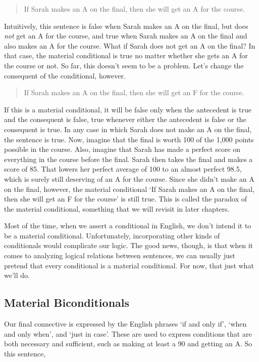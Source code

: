 \documentclass[../logic-text.tex]{subfiles}
\begin{document}
\begin{quote}
  If Sarah makes an A on the final, then she will get an A for the course.
\end{quote}

\noindent Intuitively, this sentence is false when Sarah makes an A on the final, but does \emph{not} get an A for the course, and true when Sarah makes an A on the final and also makes an A for the course. What if Sarah does not get an A on the final? In that case, the material conditional is true no matter whether she gets an A for the course or not. So far, this doesn't seem to be a problem. Let's change the consequent of the conditional, however.


\begin{quote}
  If Sarah makes an A on the final, then she will get an F for the course.
\end{quote}

If this is a material conditional, it will be false only when the antecedent is true and the consequent is false, true whenever either the antecedent is false or the consequent is true. In any case in which Sarah does not make an A on the final, the sentence is true. Now, imagine that the final is worth 100 of the 1,000 points possible in the course. Also, imagine that Sarah has made a perfect score on everything in the course before the final. Sarah then takes the final and makes a score of 85. That lowers her perfect average of 100 to an almost perfect 98.5, which is surely still deserving of an A for the course. Since she didn't make an A on the final, however, the material conditional \enquote*{If Sarah makes an A on the final, then she will get an F for the course} is still true. This is called the paradox of the material conditional, something that we will revisit in later chapters.

Most of the time, when we assert a conditional in English, we don't intend it to be a material conditional. Unfortunately, incorporating other kinds of conditionals would complicate our logic. The good news, though, is that when it comes to analyzing logical relations between sentences, we can usually just pretend that every conditional is a material conditional. For now, that just what we'll do.


\subsection{Material Biconditionals}\label{biconditional}

Our final connective is expressed by the English phrases \enquote*{if and only if}, \enquote*{when and only when}, and \enquote*{just in case}. These are used to express conditions that are both necessary and sufficient, such as making at least a 90 and getting an A. So this sentence,
\end{document}
